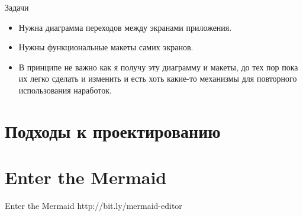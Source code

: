 \documentclass[aspectratio=169,handout,bigger]{beamer}
\begin{document}
\begin{frame}{Задачи}
  \begin{itemize}
    \item Нужна диаграмма переходов между экранами приложения.
    \item Нужны функциональные макеты самих экранов.
    \item В принципе не важно как я получу эту диаграмму и макеты,
          до тех пор пока их легко сделать и изменить
          и есть хоть какие-то механизмы для повторного использования наработок.
  \end{itemize}
\end{frame}

\section{Подходы к проектированию}


\section{Enter the Mermaid}

\begin{frame}{Enter the Mermaid}
  http://bit.ly/mermaid-editor

\end{frame}
\end{document}

